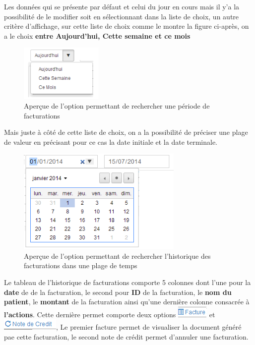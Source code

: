 \documentclass[12pt,a4paper]{report}
\begin{document}
Les données qui se présente par défaut et celui du jour en cours mais il y'a la possibilité de le modifier soit en sélectionnant dans la liste de choix, un autre critère d'affichage, sur cette liste de choix comme le montre la figure ci-après, on a le choix \textbf{entre Aujourd'hui, Cette semaine et ce mois} 


\begin{figure}[h]
\begin{center}
\includegraphics[width=4cm]{pic/SelectJour.png}
\end{center}
\caption{Aperçue de l'option permettant de rechercher une période de facturations}
\label{Aperçue de l'option permettant de rechercher une période de facturations}
\end{figure}

Mais juste à côté de cette liste de choix, on a la possibilité de préciser une plage de valeur en précisant pour ce cas la date initiale et la date terminale.

\begin{figure}[h]
\begin{center}
\includegraphics[width=8cm]{pic/SelectPlageValeur.png}
\end{center}
\caption{Aperçue de l'option permettant de rechercher l'historique des facturations dans une plage de temps}
\label{Aperçue de l'option permettant de rechercher l'historique des facturations dans une plage de temps}
\end{figure}

Le tableau de l'historique de facturations comporte 5 colonnes dont l'une pour la\textbf{ date} de de la facturation, le second pour \textbf{ID }de la facturation, le \textbf{nom du patient}, le \textbf{montant} de la facturation ainsi qu'une dernière colonne consacrée à \textbf{l'actions}. Cette dernière permet comporte deux options \includegraphics[scale=0.7]{pic/FactureF.png}  et \includegraphics[scale=0.7]{pic/NoteCredit.png}, Le premier facture permet de visualiser  la document généré pae cette facturation, le second note de crédit permet d'annuler une facturation. 
\end{document}
